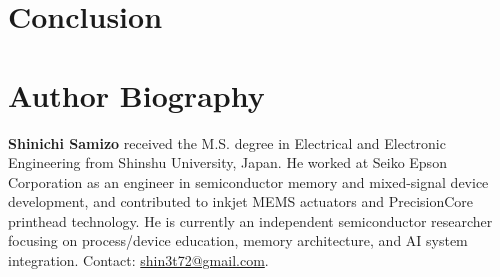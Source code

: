 \documentclass[conference]{IEEEtran}
\begin{document}
\section{Conclusion}


\nocite{Saito2004KNN,Dubois2019BioIJ}



\section*{Author Biography}
\textbf{Shinichi Samizo} received the M.S. degree in Electrical and Electronic
Engineering from Shinshu University, Japan. He worked at Seiko Epson
Corporation as an engineer in semiconductor memory and mixed-signal
device development, and contributed to inkjet MEMS actuators and
PrecisionCore printhead technology. He is currently an independent
semiconductor researcher focusing on process/device education, memory
architecture, and AI system integration. Contact:
\href{mailto:shin3t72@gmail.com}{shin3t72@gmail.com}.
\end{document}
